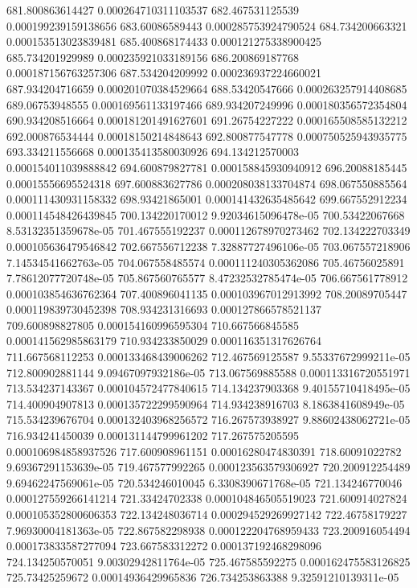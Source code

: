 {681.800863614427 0.000264710311103537
682.467531125539 0.000199239159138656
683.60086589443 0.000285753924790524
684.734200663321 0.000153513023839481
685.400868174433 0.000121275338900425
685.734201929989 0.000235921033189156
686.200869187768 0.000187156763257306
687.534204209992 0.000236937224660021
687.934204716659 0.000201070384529664
688.53420547666 0.000263257914408685
689.06753948555 0.000169561133197466
689.934207249996 0.000180356572354804
690.934208516664 0.000181201491627601
691.26754227222 0.000165508585132212
692.000876534444 0.00018150214848643
692.800877547778 0.000750525943935775
693.334211556668 0.000135413580030926
694.134212570003 0.000154011039888842
694.600879827781 0.000158845930940912
696.20088185445 0.00015556695524318
697.600883627786 0.000208038133704874
698.067550885564 0.000111430931158332
698.93421865001 0.000141432635485642
699.667552912234 0.000114548426439845
700.134220170012 9.92034615096478e-05
700.53422067668 8.53132351359678e-05
701.467555192237 0.000112678970273462
702.134222703349 0.000105636479546842
702.667556712238 7.32887727496106e-05
703.067557218906 7.14534541662763e-05
704.067558485574 0.000111240305362086
705.46756025891 7.78612077720748e-05
705.867560765577 8.47232532785474e-05
706.667561778912 0.000103854636762364
707.400896041135 0.000103967012913992
708.20089705447 0.000119839730452398
708.934231316693 0.000127866578521137
709.600898827805 0.000154160996595304
710.667566845585 0.000141562985863179
710.934233850029 0.000116351317626764
711.667568112253 0.000133468439006262
712.467569125587 9.55337672999211e-05
712.800902881144 9.09467097932186e-05
713.067569885588 0.000113316720551971
713.534237143367 0.000104572477840615
714.134237903368 9.40155710418495e-05
714.400904907813 0.000135722299590964
714.934238916703 8.1863841608949e-05
715.534239676704 0.000132403968256572
716.267573938927 9.88602438062721e-05
716.934241450039 0.000131144799961202
717.267575205595 0.000106984858937526
717.600908961151 0.00016280474830391
718.60091022782 9.69367291153639e-05
719.467577992265 0.000123563579306927
720.200912254489 9.69462247569061e-05
720.534246010045 6.3308390671768e-05
721.134246770046 0.000127559266141214
721.33424702338 0.000104846505519023
721.600914027824 0.000105352800606353
722.134248036714 0.000294529269927142
722.46758179227 7.96930004181363e-05
722.867582298938 0.000122204768959433
723.200916054494 0.000173833587277094
723.667583312272 0.000137192468298096
724.134250570051 9.00302942811764e-05
725.467585592275 0.000162475583126825
725.73425259672 0.00014936429965836
726.734253863388 9.32591210139311e-05
}

